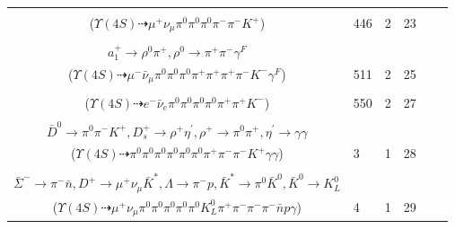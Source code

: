 \documentclass[landscape]{article}
\newcounter{rownumbers}
\newcommand\rn{\stepcounter{rownumbers}\arabic{rownumbers}}
\newcommand{\EOLP}{\\ \hline} %
\newcommand{\topoTags}[1]{#1} %
\begin{document}
\begin{longtable}{clcccc}
\rn & \makecell[l]{ $ 
\Upsilon(4S) \rightarrow B^{0} \bar{B}^{0} ,
B^{0} \rightarrow \mu^{+} \nu_{\mu} D^{-} ,
\bar{B}^{0} \rightarrow \pi^{0} D^{0} ,
D^{-} \rightarrow \pi^{-} \pi^{-} K^{+} ,
D^{0} \rightarrow \pi^{0} \pi^{0} 
$ \\ ($
\Upsilon(4S) \dashrightarrow \mu^{+} \nu_{\mu} \pi^{0} \pi^{0} \pi^{0} \pi^{-} \pi^{-} K^{+} 
$) } & \topoTags{446 & }2 & 23 \EOLP

\rn & \makecell[l]{ $ 
\Upsilon(4S) \rightarrow B^{0} \bar{B}^{0} ,
B^{0} \rightarrow \pi^{0} \bar{D}^{0} ,
\bar{B}^{0} \rightarrow \mu^{-} \bar{\nu}_{\mu} D^{*+} ,
\bar{D}^{0} \rightarrow \pi^{0} \pi^{0} ,
D^{*+} \rightarrow \pi^{+} D^{0} ,
D^{0} \rightarrow K^{-} a_{1}^{+} ,
$ \\ $
a_{1}^{+} \rightarrow \rho^{0} \pi^{+} ,
\rho^{0} \rightarrow \pi^{+} \pi^{-} \gamma^{F} 
$ \\ ($
\Upsilon(4S) \dashrightarrow \mu^{-} \bar{\nu}_{\mu} \pi^{0} \pi^{0} \pi^{0} \pi^{+} \pi^{+} \pi^{+} \pi^{-} K^{-} \gamma^{F} 
$) } & \topoTags{511 & }2 & 25 \EOLP

\rn & \makecell[l]{ $ 
\Upsilon(4S) \rightarrow B^{0} \bar{B}^{0} ,
B^{0} \rightarrow \pi^{0} \bar{D}^{0} ,
\bar{B}^{0} \rightarrow e^{-} \bar{\nu}_{e} D^{*+} ,
\bar{D}^{0} \rightarrow \pi^{0} \pi^{0} ,
D^{*+} \rightarrow \pi^{+} D^{0} ,
D^{0} \rightarrow \pi^{0} \pi^{+} K^{-} 
$ \\ ($
\Upsilon(4S) \dashrightarrow e^{-} \bar{\nu}_{e} \pi^{0} \pi^{0} \pi^{0} \pi^{0} \pi^{+} \pi^{+} K^{-} 
$) } & \topoTags{550 & }2 & 27 \EOLP

\rn & \makecell[l]{ $ 
\Upsilon(4S) \rightarrow B^{0} \bar{B}^{0} ,
B^{0} \rightarrow D^{*-} D_{s}^{*+} ,
\bar{B}^{0} \rightarrow \pi^{0} D^{0} ,
D^{*-} \rightarrow \pi^{-} \bar{D}^{0} ,
D_{s}^{*+} \rightarrow \pi^{0} D_{s}^{+} ,
D^{0} \rightarrow \pi^{0} \pi^{0} ,
$ \\ $
\bar{D}^{0} \rightarrow \pi^{0} \pi^{-} K^{+} ,
D_{s}^{+} \rightarrow \rho^{+} \eta^{\prime} ,
\rho^{+} \rightarrow \pi^{0} \pi^{+} ,
\eta^{\prime} \rightarrow \gamma \gamma 
$ \\ ($
\Upsilon(4S) \dashrightarrow \pi^{0} \pi^{0} \pi^{0} \pi^{0} \pi^{0} \pi^{0} \pi^{+} \pi^{-} \pi^{-} K^{+} \gamma \gamma 
$) } & \topoTags{3 & }1 & 28 \EOLP

\rn & \makecell[l]{ $ 
\Upsilon(4S) \rightarrow B^{0} \bar{B}^{0} ,
B^{0} \rightarrow \pi^{0} \bar{D}^{0} ,
\bar{B}^{0} \rightarrow \pi^{+} \pi^{-} D^{*+} \Sigma^{0} \bar{\Sigma}^{-} ,
\bar{D}^{0} \rightarrow \pi^{0} \pi^{0} ,
D^{*+} \rightarrow \pi^{0} D^{+} ,
\Sigma^{0} \rightarrow \Lambda \gamma ,
$ \\ $
\bar{\Sigma}^{-} \rightarrow \pi^{-} \bar{n} ,
D^{+} \rightarrow \mu^{+} \nu_{\mu} \bar{K}^{*} ,
\Lambda \rightarrow \pi^{-} p ,
\bar{K}^{*} \rightarrow \pi^{0} \bar{K}^{0} ,
\bar{K}^{0} \rightarrow K_{L}^{0} 
$ \\ ($
\Upsilon(4S) \dashrightarrow \mu^{+} \nu_{\mu} \pi^{0} \pi^{0} \pi^{0} \pi^{0} \pi^{0} K_{L}^{0} \pi^{+} \pi^{-} \pi^{-} \pi^{-} \bar{n} p \gamma 
$) } & \topoTags{4 & }1 & 29 \EOLP


\end{longtable}
\end{document}
